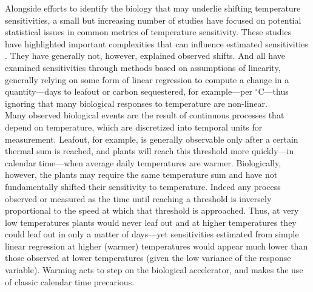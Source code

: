 \documentclass[11pt,letter]{article}
\begin{document}
Alongside efforts to identify the biology that may underlie shifting temperature sensitivities, a small but increasing number of studies have focused on potential statistical issues in common metrics of temperature sensitivity. These studies have highlighted important complexities that can influence estimated sensitivities \citep{clark2014a,gusewell2017,keenan2019}. They have generally not, however, explained observed shifts. And all have examined sensitivities through methods based on assumptions of linearity, generally relying on some form of linear regression to compute a change in a quantity---days to leafout or carbon sequestered, for example---per $^{\circ}$C---thus ignoring that many biological responses to temperature are non-linear. \\ %

Many observed biological events are the result of continuous processes that depend on temperature, which are discretized into temporal units for measurement. Leafout, for example, is generally observable only after a certain thermal sum is reached, and plants will reach this threshold more quickly---in calendar time---when average daily temperatures are warmer. Biologically, however, the plants may require the same temperature sum and have not fundamentally shifted their sensitivity to temperature. Indeed any process observed or measured as the time until reaching a threshold is inversely proportional to the speed at which that threshold is approached. Thus, at very low temperatures plants would never leaf out and at higher temperatures they could leaf out in only a matter of days---yet sensitivities estimated from simple linear regression at higher (warmer) temperatures would appear much lower than those observed at lower temperatures (given the low variance of the response variable). Warming acts to step on the biological accelerator, and makes the use of classic calendar time precarious. \\
\end{document}
